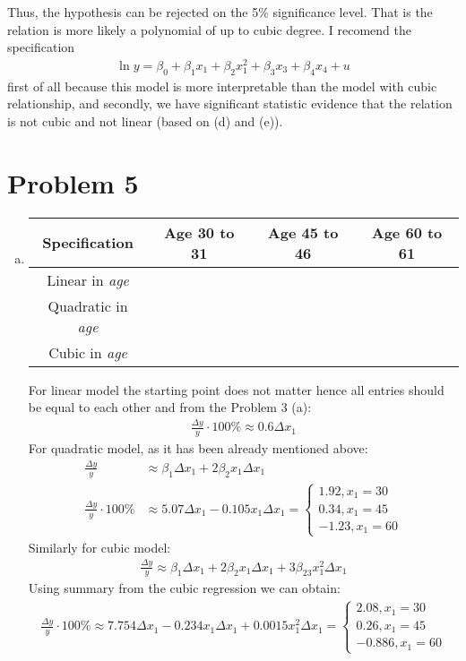 \documentclass[a4paper]{article}
\begin{document}
\begin{enumerate}[(a)]
	Thus, the hypothesis can be rejected on the 5\% significance level. That is the relation is more likely a polynomial of up to cubic degree. I recomend the specification
	\begin{align*}
	\ln y = \beta_0 + \beta_1x_1 + \beta_2x_1^2 + \beta_3x_3 + \beta_4x_4 +u
	\end{align*}
	first of all because this model is more interpretable than the model with cubic relationship, and secondly, we have significant statistic evidence that the relation is not cubic and not linear (based on (d) and (e)).
	\end{enumerate}

\section*{Problem 5}
\begin{enumerate}[(a)]
	\item 
\begin{table}[h]
	\begin{tabular}{cccc}
		Specification & Age 30 to 31  & Age 45 to 46 & Age 60 to 61 \\
		\hline
		Linear in \textit{age}&  &  &  \\
		Quadratic in \textit{age}  &  &  &  \\
		Cubic in \textit{age} &  &  &\\
		\hline 
	\end{tabular}
\end{table}

For linear model the starting point does not matter hence all entries should be equal to each other and from the Problem 3 (a):
\begin{align*}
\frac{\Delta y}{y} \cdot 100 \% \approx 0.6 \Delta x_1
\end{align*}
For quadratic model, as it has been already mentioned above:
\begin{align*}
\frac{\Delta y}{y} &\approx \beta_1 \Delta x_1 + 2 \beta_2x_1\Delta x_1\\
\frac{\Delta y}{y} \cdot 100 \% &\approx 5.07 \Delta x_1 -0.105 x_1 \Delta x_1 = \begin{cases}
1.92, x_1 = 30\\
0.34, x_1 = 45\\
-1.23, x_1 = 60
\end{cases}
\end{align*}
Similarly for cubic model:
\begin{align*}
\frac{\Delta y}{y} \approx \beta_1 \Delta x_1 + 2 \beta_2 x_1 \Delta x_1 + 3\beta_{23}x_1^2 \Delta x_1
\end{align*}
Using summary from the cubic regression we can obtain:
\begin{align*}
\frac{\Delta y}{y} \cdot 100 \% \approx 7.754 \Delta x_1 - 0.234 x_1 \Delta x_1 + 0.0015 x_1^2 \Delta x_1 = \begin{cases}
2.08, x_1 = 30\\
0.26, x_1 = 45\\
-0.886, x_1 = 60
\end{cases}
\end{align*}



\end{enumerate}
\end{document}
